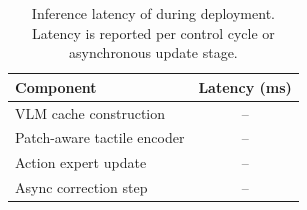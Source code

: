\begin{table}[t]
\centering
\caption{Inference latency of \systemname during deployment. Latency is reported per control cycle or asynchronous update stage.}
\label{tab:latency_results}
\footnotesize
\setlength{\tabcolsep}{6pt}
\begin{tabular}{lc}
\toprule
\textbf{Component}
& \textbf{Latency (ms)} \\
\midrule
VLM cache construction
& -- \\
Patch-aware tactile encoder
& -- \\
Action expert update
& -- \\
Async correction step
& -- \\
\bottomrule
\end{tabular}
\end{table}
